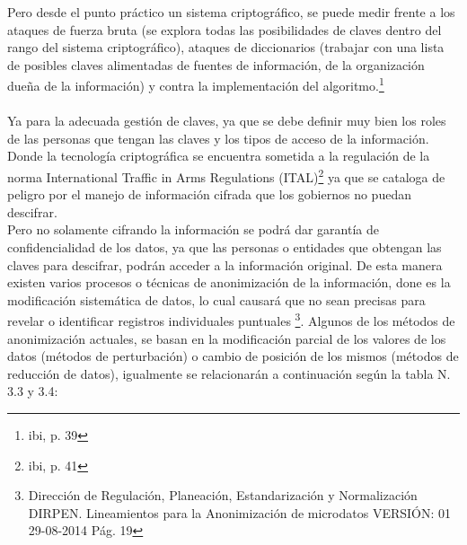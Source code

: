 \documentclass[a4paper,openright,12pt]{book}
\theoremstyle{definition}
\theoremstyle{remark}
\begin{document}
Pero desde el punto práctico un sistema criptográfico, se puede medir frente a los ataques de fuerza bruta (se explora todas las posibilidades de claves dentro del rango del sistema criptográfico),  ataques de diccionarios (trabajar con una lista de posibles claves alimentadas de fuentes de información, de la organización dueña de la información) y contra la implementación del algoritmo.\footnote{ibi, p. 39}\\\\
Ya para la adecuada gestión de claves, ya que se debe definir muy bien los roles de las personas que tengan las claves y los tipos de acceso de la información. Donde la tecnología criptográfica se encuentra sometida a la regulación de la norma International Traffic in Arms Regulations (ITAL)\footnote{ibi, p. 41} ya que se cataloga de peligro por el manejo de información cifrada que los gobiernos no puedan descifrar.\\  
Pero no solamente cifrando la información se podrá dar garantía de confidencialidad de los datos, ya que las personas o entidades que obtengan las claves para descifrar, podrán acceder a la información original. De esta manera existen varios procesos o técnicas de anonimización de la información, done es la modificación sistemática de datos, lo cual causará que no sean precisas para revelar o identificar registros individuales puntuales \footnote{Dirección de Regulación, Planeación, Estandarización y Normalización DIRPEN. Lineamientos para
la Anonimización de microdatos VERSIÓN: 01 29-08-2014 Pág. 19}.
Algunos de los métodos de anonimización actuales, se basan en la modificación parcial de los valores de los datos (métodos de perturbación) o cambio de posición de los mismos (métodos de reducción de datos), igualmente se relacionarán a continuación según la tabla N. 3.3 y 3.4: 
\end{document}
